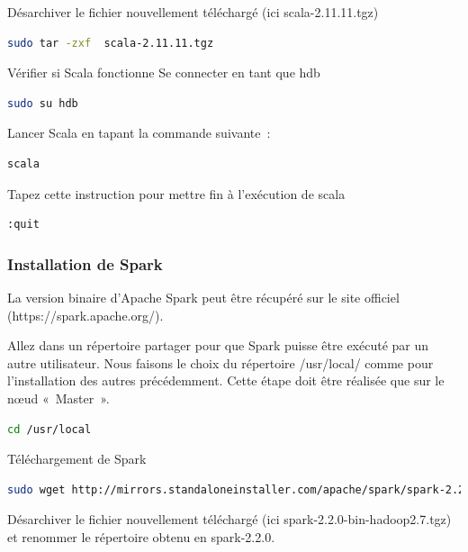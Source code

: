\documentclass[12pt,english]{book}
\begin{document}
Désarchiver le fichier nouvellement téléchargé (ici scala-2.11.11.tgz)

\begin{lstlisting}[language=bash, frame=single]
sudo tar -zxf  scala-2.11.11.tgz
\end{lstlisting}

Vérifier si Scala fonctionne
Se connecter en tant que hdb

\begin{lstlisting}[language=bash, frame=single]
sudo su hdb
\end{lstlisting}

Lancer Scala en tapant la commande suivante :

\begin{lstlisting}[language=bash, frame=single]
scala
\end{lstlisting}

Tapez cette instruction pour mettre fin à l'exécution de scala

\begin{lstlisting}[language=bash, frame=single]
:quit
\end{lstlisting}

\subsubsection{Installation de Spark}

La version binaire d’Apache Spark peut être récupéré sur le site officiel (https://spark.apache.org/).

Allez dans un répertoire partager pour que Spark puisse être exécuté par un autre utilisateur.
Nous faisons le choix du répertoire /usr/local/ comme pour l’installation des autres précédemment.
Cette étape doit être réalisée que sur le nœud « Master ».

\begin{lstlisting}[language=bash, frame=single]
cd /usr/local
\end{lstlisting}

Téléchargement de Spark

\begin{lstlisting}[language=bash, frame=single, breaklines=true, postbreak=\mbox{\textcolor{red}{$\hookrightarrow$}\space}]
sudo wget http://mirrors.standaloneinstaller.com/apache/spark/spark-2.2.0/spark-2.2.0-bin-hadoop2.7.tgz
\end{lstlisting}

Désarchiver le fichier nouvellement téléchargé (ici spark-2.2.0-bin-hadoop2.7.tgz) et renommer le répertoire obtenu en spark-2.2.0.
\end{document}
